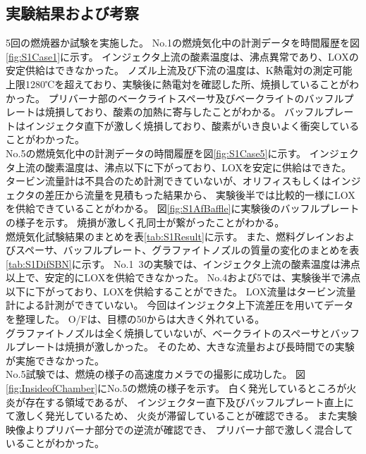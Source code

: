 \subsection{実験結果および考察}
5回の燃焼器か試験を実施した。
No.1の燃焼気化中の計測データを時間履歴を図\ref{fig:S1Case1}に示す。
インジェクタ上流の酸素温度は、沸点異常であり、LOXの安定供給はできなかった。
ノズル上流及び下流の温度は、K熱電対の測定可能上限1280℃を超えており、実験後に熱電対を確認した所、焼損していることがわかった。
プリバーナ部のベークライトスペーサ及びベークライトのバッフルプレートは焼損しており、酸素の加熱に寄与したことがわかる。
バッフルプレートはインジェクタ直下が激しく焼損しており、酸素がいき良いよく衝突していることがわかった。
\\
No.5の燃焼気化中の計測データの時間履歴を図\ref{fig:S1Case5}に示す。
インジェクタ上流の酸素温度は、沸点以下に下がっており、LOXを安定に供給はできた。
タービン流量計は不具合のため計測できていないが、オリフィスもしくはインジェクタの差圧から流量を見積もった結果から、
実験後半では比較的一様にLOXを供給できていることがわかる。
図\ref{fig:S1AfBaffle}に実験後のバッフルプレートの様子を示す。
焼損が激しく孔同士が繋がったことがわかる。
\\
燃焼気化試験結果のまとめを表\ref{tab:S1Result}に示す。
また、燃料グレインおよびスペーサ、バッフルプレート、グラファイトノズルの質量の変化のまとめを表\ref{tab:S1DifSBN}に示す。
No.1~3の実験では、インジェクタ上流の酸素温度は沸点以上で、安定的にLOXを供給できなかった。
No.4および5では、実験後半で沸点以下に下がっており、LOXを供給することができた。
LOX流量はタービン流量計による計測ができていない。
今回はインジェクタ上下流差圧を用いてデータを整理した。
O/Fは、目標の50からは大きく外れている。
\\
グラファイトノズルは全く焼損していないが、ベークライトのスペーサとバッフルプレートは焼損が激しかった。
そのため、大きな流量および長時間での実験が実施できなかった。
\\
No.5試験では、燃焼の様子の高速度カメラでの撮影に成功した。
図\ref{fig:InsideofChamber}にNo.5の燃焼の様子を示す。
白く発光しているところが火炎が存在する領域であるが、
インジェクター直下及びバッフルプレート直上にて激しく発光しているため、
火炎が滞留していることが確認できる。
また実験映像よりプリバーナ部分での逆流が確認でき、
プリバーナ部で激しく混合していることがわかった。
